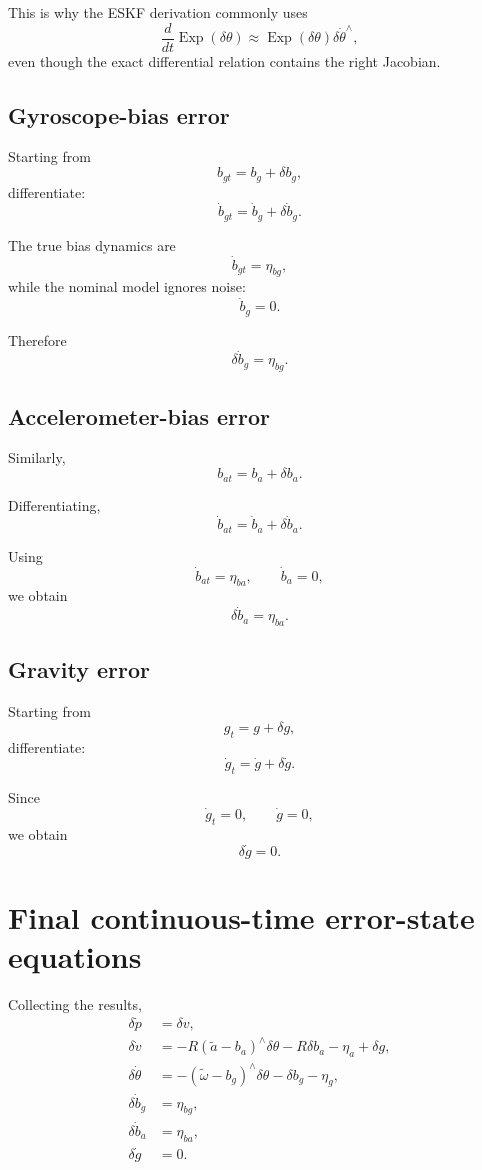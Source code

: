 \documentclass[11pt]{article}
\numberwithin{equation}{section}
\newcommand{\Exp}{\operatorname{Exp}}
\begin{document}
This is why the ESKF derivation commonly uses
\[
\frac{d}{dt}\Exp(\delta\theta)
\approx
\Exp(\delta\theta)\delta\dot\theta^\wedge,
\]
even though the exact differential relation contains the right
Jacobian.

\subsection{Gyroscope-bias error}

Starting from
\[
b_{gt}=b_g+\delta b_g,
\]
differentiate:
\[
\dot b_{gt}
=
\dot b_g+\delta\dot b_g.
\]

The true bias dynamics are
\[
\dot b_{gt}=\eta_{bg},
\]
while the nominal model ignores noise:
\[
\dot b_g=0.
\]

Therefore
\begin{equation}
\boxed{
\delta\dot b_g=\eta_{bg}.
}
\end{equation}

\subsection{Accelerometer-bias error}

Similarly,
\[
b_{at}=b_a+\delta b_a.
\]

Differentiating,
\[
\dot b_{at}
=
\dot b_a+\delta\dot b_a.
\]

Using
\[
\dot b_{at}=\eta_{ba},
\qquad
\dot b_a=0,
\]
we obtain
\begin{equation}
\boxed{
\delta\dot b_a=\eta_{ba}.
}
\end{equation}

\subsection{Gravity error}

Starting from
\[
g_t=g+\delta g,
\]
differentiate:
\[
\dot g_t=\dot g+\delta\dot g.
\]

Since
\[
\dot g_t=0,
\qquad
\dot g=0,
\]
we obtain
\begin{equation}
\boxed{
\delta\dot g=0.
}
\end{equation}

\section{Final continuous-time error-state equations}

Collecting the results,
\begin{equation}
\boxed{
\begin{aligned}
\delta\dot p
&=
\delta v,\\[1mm]
\delta\dot v
&=
-R(\tilde a-b_a)^\wedge\delta\theta
-R\delta b_a
-\eta_a
+\delta g,\\[1mm]
\delta\dot\theta
&=
-(\tilde\omega-b_g)^\wedge\delta\theta
-\delta b_g
-\eta_g,\\[1mm]
\delta\dot b_g
&=
\eta_{bg},\\[1mm]
\delta\dot b_a
&=
\eta_{ba},\\[1mm]
\delta\dot g
&=
0.
\end{aligned}
}
\end{equation}
\end{document}
